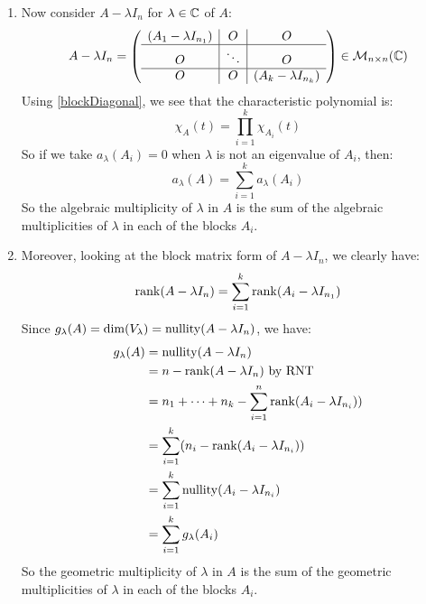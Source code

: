 \documentclass[../main.tex]{subfiles}
\begin{document}
\begin{remark}[Remarks]
\begin{enumerate}
      We can use this to find the multiplicity of the root $\lambda$ in $m_{A}$ similarly to how we find the powers in the prime factorisation of the lowest common multiple of a set of integers:
      \[
        c_{\lambda}(A) = \max\{c_{\lambda}(A_1), \ldots, c_{\lambda}(A_k)\}
      \]
    \item Now consider $A - \lambda I_n$ for $\lambda \in \mathbb{C}$ of $A$:
      \[
        A - \lambda I_n = \left(\begin{array}{c|c|c}
            (A_1 - \lambda I_{n_1}) & O & O \\ \hline
            O & \ddots & O \\ \hline
          O & O & (A_k - \lambda I_{n_k})
        \end{array}\right) \in \mathcal{M}_{n \times n}(\mathbb{C})
      \]
      Using \cref{blockDiagonal}, we see that the characteristic polynomial is:
      \[
        \chi_{A}(t) = \prod_{i = 1}^{k} \chi_{A_i}(t)
      \]
      So if we take $a_{\lambda}(A_i) = 0$ when $\lambda$ is not an eigenvalue of $A_i$, then:
      \[
        a_{\lambda}(A) = \sum_{i = 1}^{k} a_{\lambda}(A_i)
      \]
      So the algebraic multiplicity of $\lambda$ in $A$ is the sum of the algebraic multiplicities of $\lambda$ in each of the blocks $A_i$.
    \item Moreover, looking at the block matrix form of $A - \lambda I_n$, we clearly have:
      \[
        \operatorname{rank}(A - \lambda I_n) = \sum_{i = 1}^{k} \operatorname{rank}(A_i - \lambda I_{n_1})
      \]
      Since $g_{\lambda}(A) = \dim(V_{\lambda}) = \operatorname{nullity}(A - \lambda I_n)$, we have:
      \begin{align*}
        g_{\lambda}(A) &= \operatorname{nullity}(A - \lambda I_n) \\
                       &= n - \operatorname{rank}(A - \lambda I_n) \text{ by RNT} \\
                       &= n_1 + \cdots + n_k - \sum_{i = 1}^{n} \operatorname{rank}(A_i - \lambda I_{n_i})) \\
                       &= \sum_{i = 1}^{k} (n_i - \operatorname{rank}(A_i - \lambda I_{n_i})) \\
                       &= \sum_{i = 1}^{k} \operatorname{nullity}(A_i - \lambda I_{n_i}) \\
                       &= \sum_{i = 1}^{k} g_{\lambda}(A_i)
      \end{align*}
      So the geometric multiplicity of $\lambda$ in $A$ is the sum of the geometric multiplicities of $\lambda$ in each of the blocks $A_i$.
  \end{enumerate}
\end{remark}
\end{document}
